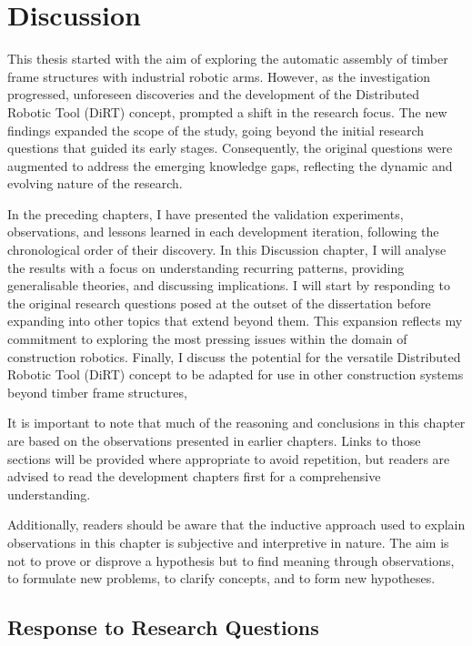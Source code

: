 \chapter{Discussion}
\label{chapter:discussion}

This thesis started with the aim of exploring the automatic assembly of timber frame structures with industrial robotic arms. However, as the investigation progressed, unforeseen discoveries and the development of the Distributed Robotic Tool (DiRT) concept, prompted a shift in the research focus. The new findings expanded the scope of the study, going beyond the initial research questions that guided its early stages. Consequently, the original questions were augmented to address the emerging knowledge gaps, reflecting the dynamic and evolving nature of the research.

In the preceding chapters, I have presented the validation experiments, observations, and lessons learned in each development iteration, following the chronological order of their discovery. In this Discussion chapter, I will analyse the results with a focus on understanding recurring patterns, providing generalisable theories, and discussing implications. I will start by responding to the original research questions posed at the outset of the dissertation before expanding into other topics that extend beyond them. This expansion reflects my commitment to exploring the most pressing issues within the domain of construction robotics. Finally, I discuss the potential for the versatile Distributed Robotic Tool (DiRT) concept to be adapted for use in other construction systems beyond timber frame structures,

It is important to note that much of the reasoning and conclusions in this chapter are based on the observations presented in earlier chapters. Links to those sections will be provided where appropriate to avoid repetition, but readers are advised to read the development chapters first for a comprehensive understanding.

Additionally, readers should be aware that the inductive approach used to explain observations in this chapter is subjective and interpretive in nature. The aim is not to prove or disprove a hypothesis but to find meaning through observations, to formulate new problems, to clarify concepts, and to form new hypotheses.

\section{Response to Research Questions}
\label{section:discussion-response-to-research-questions}

